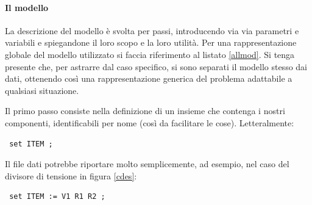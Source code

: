 \paragraph{Il modello}
La descrizione del modello è svolta per passi, introducendo via via parametri e variabili e spiegandone il loro scopo e la loro utilità. Per una rappresentazione globale del modello utilizzato si faccia riferimento al listato \ref{allmod}. Si tenga presente che, per astrarre dal caso specifico, si sono separati il modello stesso dai dati, ottenendo così una rappresentazione generica del problema adattabile a qualsiasi situazione.

Il primo passo consiste nella definizione di un insieme che contenga i nostri componenti, identificabili per nome (così da facilitare le cose). Letteralmente:
\small
\begin{verbatim}
 set ITEM ;
\end{verbatim}
\normalsize
Il file dati potrebbe riportare molto semplicemente, ad esempio, nel caso del divisore di tensione in figura \ref{cdes}:
\small
\begin{verbatim}
 set ITEM := V1 R1 R2 ;
\end{verbatim}
\normalsize

